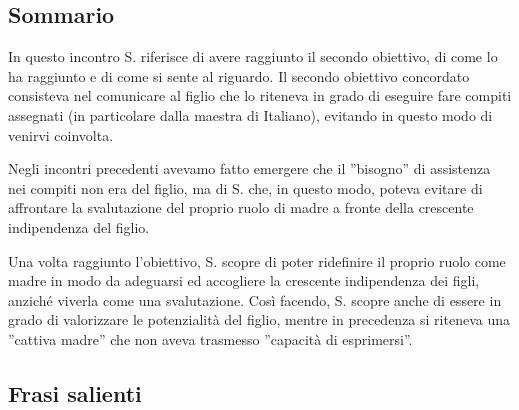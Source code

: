 \subsection*{Sommario}
In questo incontro S. riferisce di avere raggiunto il secondo obiettivo, di come lo ha raggiunto e di come si sente al riguardo.	Il secondo obiettivo concordato consisteva nel comunicare al figlio che lo riteneva in grado di eseguire fare  compiti assegnati (in particolare dalla maestra di Italiano), evitando in questo modo di venirvi coinvolta.

Negli incontri precedenti avevamo fatto emergere che il ''bisogno'' di assistenza nei compiti non era del figlio, ma di S. che, in questo modo, poteva evitare di affrontare la svalutazione del proprio ruolo di madre a fronte della crescente indipendenza del figlio.

Una volta raggiunto l'obiettivo, S. scopre di poter ridefinire il proprio ruolo come madre in modo da adeguarsi ed accogliere la crescente indipendenza dei figli, anziché viverla come una svalutazione. Così facendo, S. scopre anche di essere in grado di valorizzare le potenzialità del figlio, mentre in precedenza si riteneva una ''cattiva madre'' che non aveva trasmesso ''capacità di esprimersi''.

\subsection*{Frasi salienti}

